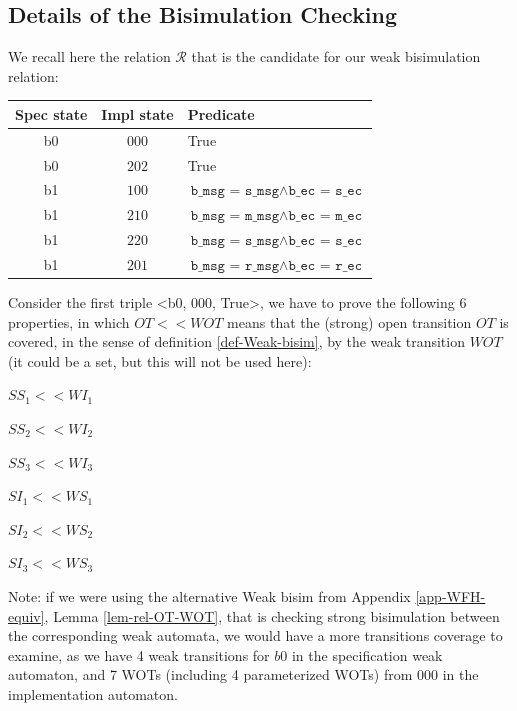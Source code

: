 \documentclass{lmcs}
\begin{document}
        \subsection{Details of the Bisimulation Checking}
         
We recall here the relation $\mathcal{R}$ that is the candidate for our weak bisimulation relation:

\bigskip
  \begin{tabular}{|c|c|l|}
\hline
    Spec state & Impl state & Predicate\\
    \hline
    b0 & $000$ & True\\
    b0 & $202$ & True\\
    b1 & $100$ & $\texttt{b\_msg = s\_msg} \land \texttt{b\_ec = s\_ec}$\\
    b1 & $210$ & $\texttt{b\_msg = m\_msg} \land \texttt{b\_ec = m\_ec}$\\
    b1 & $220$ & $\texttt{b\_msg = s\_msg} \land \texttt{b\_ec = s\_ec}$\\
    b1 & $201$ & $\texttt{b\_msg = r\_msg} \land \texttt{b\_ec = r\_ec}$\\
    \hline
    \end{tabular}


\bigskip
Consider the first triple <b0, 000, True>, we have to prove the following 6 properties, in which $OT<<WOT$ means that the (strong) open transition $OT$ is covered, in the sense
of definition \ref{def-Weak-bisim}, by the weak transition $WOT$ (it could be a set, but this will not be used here):

\bigskip
\begin{minipage}{0.2\linewidth} 	 
$SS_1 << WI_1$

$SS_2 << WI_2$

$SS_3 << WI_3$
\end{minipage}
\hspace{1cm}
\begin{minipage}{0.4\linewidth}
$SI_1 << WS_1$

$SI_2 << WS_2$

$SI_3 << WS_3$
\end{minipage}




\bigskip

         
         Note: if we were using the alternative Weak bisim from Appendix \ref{app-WFH-equiv}, Lemma \ref{lem-rel-OT-WOT}, that is checking strong bisimulation between the corresponding 
weak automata, we would have a more transitions coverage to examine, as we have 4 weak transitions for $b0$ in the specification weak automaton, and 7 WOTs (including 4 
parameterized WOTs) from 000 in the implementation automaton.
         
\end{document}
